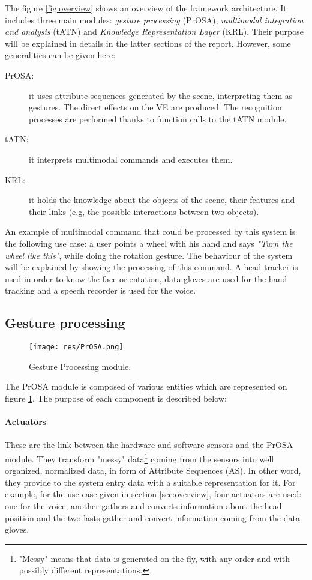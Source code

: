 \documentclass[a4paper]{article}
\begin{document}
The figure \ref{fig:overview} shows an overview of the framework architecture. It includes three main modules: \textit{gesture processing} (PrOSA), \textit{multimodal integration and analysis} (tATN) and \textit{Knowledge Representation Layer} (KRL). Their purpose will be explained in details in the latter sections of the report. However, some generalities can be given here:
\begin{description}
	\item[PrOSA:] it uses attribute sequences generated by the scene, interpreting them as gestures. The direct effects on the VE are produced. The recognition processes are performed thanks to function calls to the tATN module.
	\item[tATN:] it interprets multimodal commands and executes them.
	\item[KRL:] it holds the knowledge about the objects of the scene, their features and their links (e.g, the possible interactions between two objects).
\end{description}

An example of multimodal command that could be processed by this system is the following use case: a user points a wheel with his hand and says \textit{"Turn the wheel like this"}, while doing the rotation gesture. The behaviour of the system will be explained by showing the processing of this command. A head tracker is used in order to know the face orientation, data gloves are used for the hand tracking and a speech recorder is used for the voice.

\subsection{Gesture processing}

\begin{figure}
\centering
\texttt{[image: res/PrOSA.png]}
\caption{\label{fig:PrOSA}Gesture Processing module.}
\end{figure}

The PrOSA module is composed of various entities which are represented on figure \ref{fig:PrOSA}. The purpose of each component is described below:

\paragraph{Actuators} These are the link between the hardware and software sensors and the PrOSA module. They transform "messy" data\footnote{"Messy" means that data is generated on-the-fly, with any order and with possibly different representations.} coming from the sensors into well organized, normalized data, in form of Attribute Sequences (AS). In other word, they provide to the system entry data with a suitable representation for it. For example, for the use-case given in section \ref{sec:overview}, four actuators are used: one for the voice, another gathers and converts information about the head position and the two lasts gather and convert information coming from the data gloves.
\end{document}
